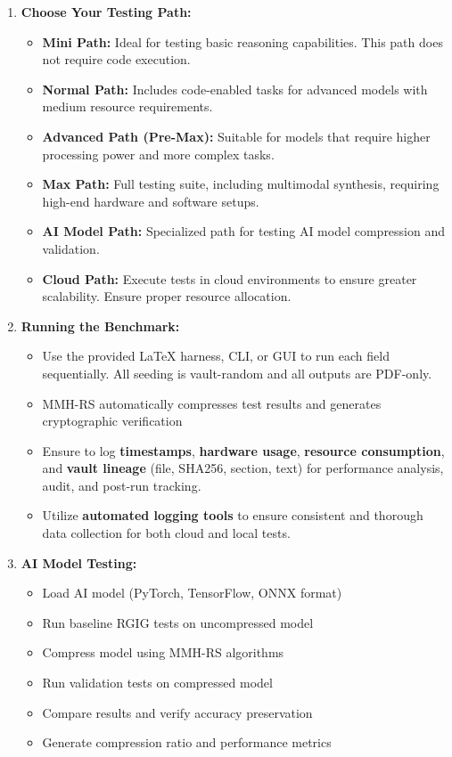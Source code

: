 \begin{enumerate}
  \item \textbf{Choose Your Testing Path:}
  \begin{itemize}
    \item \textbf{Mini Path:} Ideal for testing basic reasoning capabilities. This path does not require code execution.
    \item \textbf{Normal Path:} Includes code-enabled tasks for advanced models with medium resource requirements.
    \item \textbf{Advanced Path (Pre-Max):} Suitable for models that require higher processing power and more complex tasks.
    \item \textbf{Max Path:} Full testing suite, including multimodal synthesis, requiring high-end hardware and software setups.
    \item \textbf{AI Model Path:} Specialized path for testing AI model compression and validation.
    \item \textbf{Cloud Path:} Execute tests in cloud environments to ensure greater scalability. Ensure proper resource allocation.
  \end{itemize}

  \item \textbf{Running the Benchmark:}
  \begin{itemize}
    \item Use the provided LaTeX harness, CLI, or GUI to run each field sequentially. All seeding is vault-random and all outputs are PDF-only.
    \item MMH-RS automatically compresses test results and generates cryptographic verification
    \item Ensure to log \textbf{timestamps}, \textbf{hardware usage}, \textbf{resource consumption}, and \textbf{vault lineage} (file, SHA256, section, text) for performance analysis, audit, and post-run tracking.
    \item Utilize \textbf{automated logging tools} to ensure consistent and thorough data collection for both cloud and local tests.
  \end{itemize}

  \item \textbf{AI Model Testing:}
  \begin{itemize}
    \item Load AI model (PyTorch, TensorFlow, ONNX format)
    \item Run baseline RGIG tests on uncompressed model
    \item Compress model using MMH-RS algorithms
    \item Run validation tests on compressed model
    \item Compare results and verify accuracy preservation
    \item Generate compression ratio and performance metrics
  \end{itemize}


\end{enumerate}
